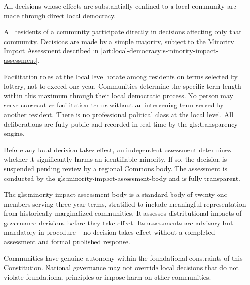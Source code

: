 


All decisions whose effects are substantially confined to a local community are made through direct local democracy.

All residents of a community participate directly in decisions affecting only that community. Decisions are made by a simple majority, subject to the Minority Impact Assessment described in \ref{art:local-democracy:s-minority-impact-assessment}.

Facilitation roles at the local level rotate among residents on terms selected by lottery, not to exceed one year. Communities determine the specific term length within this maximum through their local democratic process. No person may serve consecutive facilitation terms without an intervening term served by another resident. There is no professional political class at the local level. All deliberations are fully public and recorded in real time by the \gls{gls:transparency-engine}.

Before any local decision takes effect, an independent assessment determines whether it significantly harms an identifiable minority. If so, the decision is suspended pending review by a regional Commons body. The assessment is conducted by the \gls{gls:minority-impact-assessment-body} and is fully transparent.

The \gls{gls:minority-impact-assessment-body} is a standard body of twenty-one members serving three-year terms, stratified to include meaningful representation from historically marginalized communities. It assesses distributional impacts of governance decisions before they take effect. Its assessments are advisory but mandatory in procedure -- no decision takes effect without a completed assessment and formal published response.

Communities have genuine autonomy within the foundational constraints of this Constitution. National governance may not override local decisions that do not violate foundational principles or impose harm on other communities.

